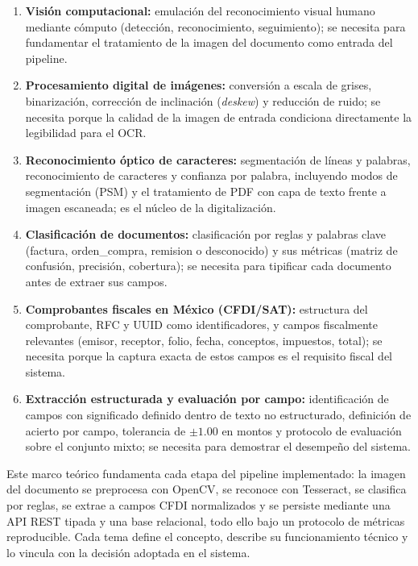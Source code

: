 \begin{enumerate}
    \item \textbf{Visión computacional:} emulación del reconocimiento visual humano mediante cómputo (detección, reconocimiento, seguimiento); se necesita para fundamentar el tratamiento de la imagen del documento como entrada del pipeline.
    \item \textbf{Procesamiento digital de imágenes:} conversión a escala de grises, binarización, corrección de inclinación (\textit{deskew}) y reducción de ruido; se necesita porque la calidad de la imagen de entrada condiciona directamente la legibilidad para el OCR.
    \item \textbf{Reconocimiento óptico de caracteres:} segmentación de líneas y palabras, reconocimiento de caracteres y confianza por palabra, incluyendo modos de segmentación (PSM) y el tratamiento de PDF con capa de texto frente a imagen escaneada; es el núcleo de la digitalización.
    \item \textbf{Clasificación de documentos:} clasificación por reglas y palabras clave (factura, orden\_compra, remision o desconocido) y sus métricas (matriz de confusión, precisión, cobertura); se necesita para tipificar cada documento antes de extraer sus campos.
    \item \textbf{Comprobantes fiscales en México (CFDI/SAT):} estructura del comprobante, RFC y UUID como identificadores, y campos fiscalmente relevantes (emisor, receptor, folio, fecha, conceptos, impuestos, total); se necesita porque la captura exacta de estos campos es el requisito fiscal del sistema.
    \item \textbf{Extracción estructurada y evaluación por campo:} identificación de campos con significado definido dentro de texto no estructurado, definición de acierto por campo, tolerancia de $\pm 1.00$ en montos y protocolo de evaluación sobre el conjunto mixto; se necesita para demostrar el desempeño del sistema.
\end{enumerate}


Este marco teórico fundamenta cada etapa del pipeline implementado: la imagen del documento se preprocesa con OpenCV, se reconoce con Tesseract, se clasifica por reglas, se extrae a campos CFDI normalizados y se persiste mediante una API REST tipada y una base relacional, todo ello bajo un protocolo de métricas reproducible. Cada tema define el concepto, describe su funcionamiento técnico y lo vincula con la decisión adoptada en el sistema.

